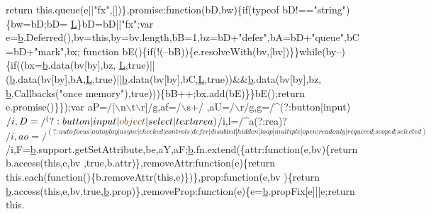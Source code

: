 \begin{DoxyCode}
{      return} this.queue(e||\textcolor{stringliteral}{"fx"},[])\},promise:\textcolor{keyword}{function}(bD,bw)\{\textcolor{keywordflow}{if}(typeof bD!==\textcolor{stringliteral}{"string"})\{bw=bD;bD=
      \hyperlink{a00039_a38ee4c0b5f4fe2a18d0c783af540d253}{L}\}bD=bD||\textcolor{stringliteral}{"fx"};var e=\hyperlink{a00039_aa4026ad5544b958e54ce5e106fa1c805}{b}.Deferred(),bv=\textcolor{keyword}{this},by=bv.length,bB=1,bz=bD+\textcolor{stringliteral}{"defer"},bA=bD+\textcolor{stringliteral}{"queue"},bC=bD+\textcolor{stringliteral}{"mark"},bx;\textcolor{keyword}{
      function} bE()\{\textcolor{keywordflow}{if}(!(--bB))\{e.resolveWith(bv,[bv])\}\}\textcolor{keywordflow}{while}(by--)\{\textcolor{keywordflow}{if}((bx=\hyperlink{a00039_aa4026ad5544b958e54ce5e106fa1c805}{b}.data(bv[by],bz,
      \hyperlink{a00039_a38ee4c0b5f4fe2a18d0c783af540d253}{L},\textcolor{keyword}{true})||(\hyperlink{a00039_aa4026ad5544b958e54ce5e106fa1c805}{b}.data(bv[by],bA,\hyperlink{a00039_a38ee4c0b5f4fe2a18d0c783af540d253}{L},\textcolor{keyword}{true})||\hyperlink{a00039_aa4026ad5544b958e54ce5e106fa1c805}{b}.data(bv[by],bC,\hyperlink{a00039_a38ee4c0b5f4fe2a18d0c783af540d253}{L},\textcolor{keyword}{true}))&&\hyperlink{a00039_aa4026ad5544b958e54ce5e106fa1c805}{b}.data(bv[by],bz,
      \hyperlink{a00039_aa4026ad5544b958e54ce5e106fa1c805}{b}.Callbacks(\textcolor{stringliteral}{"once memory"}),\textcolor{keyword}{true})))\{bB++;bx.add(bE)\}\}bE();\textcolor{keywordflow}{return} e.promise()\}\});var aP=/[\(\backslash\)n\(\backslash\)t\(\backslash\)r]/g,af=/\(\backslash\)s+/
      ,aU=/\(\backslash\)r/g,g=/^(?:button|input)$/i,D=/^(?:button|input|\textcolor{keywordtype}{object}|select|textarea)$/i,l=/^a(?:rea)?$/i,ao=/^(?:
      autofocus|autoplay|async|checked|controls|defer|disabled|hidden|loop|multiple|open|readonly|required|scoped|
      selected)$/i,F=\hyperlink{a00039_aa4026ad5544b958e54ce5e106fa1c805}{b}.support.getSetAttribute,be,aY,aF;\hyperlink{a00039_aa4026ad5544b958e54ce5e106fa1c805}{b}.fn.extend(\{attr:function(e,bv)\{return b.access(this,e,bv
      ,true,b.attr)\},removeAttr:\textcolor{keyword}{function}(e)\{return this.each(function()\{b.removeAttr(this,e)\})\},prop:\textcolor{keyword}{function}(e,bv
      )\{\textcolor{keywordflow}{return} \hyperlink{a00039_aa4026ad5544b958e54ce5e106fa1c805}{b}.access(\textcolor{keyword}{this},e,bv,\textcolor{keyword}{true},\hyperlink{a00039_aa4026ad5544b958e54ce5e106fa1c805}{b}.prop)\},removeProp:\textcolor{keyword}{function}(e)\{e=\hyperlink{a00039_aa4026ad5544b958e54ce5e106fa1c805}{b}.propFix[e]||e;\textcolor{keywordflow}{return} this.

\end{DoxyCode}
